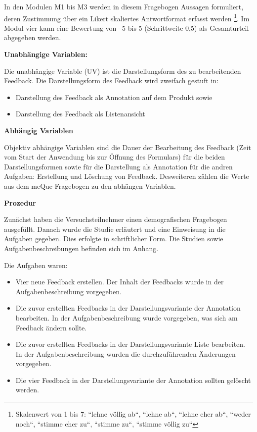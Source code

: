 In den Modulen M1 bis M3 werden in diesem Fragebogen Aussagen formuliert, deren Zustimmung über ein Likert skaliertes Antwortformat erfasst werden \footnote{Skalenwert von 1 bis 7: ``lehne völlig ab``, ``lehne ab``, ``lehne eher ab``, ``weder
	noch``, ``stimme eher zu``, ``stimme zu``, ``stimme völlig zu``}\cite{Minge2013}. Im Modul vier kann eine Bewertung von –5 bis 5 (Schrittweite 0,5) als Gesamturteil abgegeben werden. 

\textbf{Unabhängige Variablen:}

Die unabhängige Variable (UV) ist die Darstellungsform des zu bearbeitenden Feedback. Die Darstellungsform des Feedback wird zweifach gestuft in: 

\begin{itemize}
\item Darstellung des Feedback als Annotation auf dem Produkt sowie
\item Darstellung des Feedback als Listenansicht 
\end{itemize}

\textbf{Abhängig Variablen}

Objektiv abhängige Variablen sind die Dauer der Bearbeitung des Feedback (Zeit vom Start der Anwendung bis zur Öffnung des Formulars) für die beiden Darstellungsformen sowie für die Darstellung als Annotation für die andren Aufgaben: Erstellung und Löschung von Feedback. Desweiteren zählen die Werte aus dem meQue Fragebogen zu den abhängen Variablen.

\textbf{Prozedur}

Zunächst haben die Versuchsteilnehmer einen demografischen Fragebogen ausgefüllt. Danach wurde die Studie erläutert und eine Einweisung in die Aufgaben gegeben. 
Dies erfolgte in schriftlicher Form. Die Studien sowie Aufgabenbeschreibungen befinden sich im Anhang. 

Die Aufgaben waren: 

\begin{itemize}
	\item Vier neue Feedback erstellen. Der Inhalt der Feedbacks wurde in der Aufgabenbeschreibung vorgegeben. 
	\item Die zuvor erstellten Feedbacks in der Darstellungsvariante der Annotation bearbeiten. In der Aufgabenbeschreibung wurde vorgegeben, was sich am Feedback ändern sollte.
	\item Die zuvor erstellten Feedbacks in der Darstellungsvariante Liste bearbeiten. In der Aufgabenbeschreibung wurden die durchzuführenden Änderungen vorgegeben.
	\item Die vier Feedback in der Darstellungsvariante der Annotation sollten gelöscht werden.
\end{itemize}

